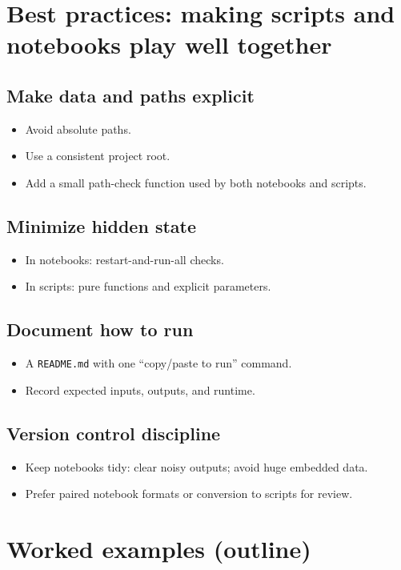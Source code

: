\section{Best practices: making scripts and notebooks play well together}
\subsection{Make data and paths explicit}
\begin{itemize}
\item Avoid absolute paths.
\item Use a consistent project root.
\item Add a small path-check function used by both notebooks and scripts.
\end{itemize}

\subsection{Minimize hidden state}
\begin{itemize}
\item In notebooks: restart-and-run-all checks.
\item In scripts: pure functions and explicit parameters.
\end{itemize}

\subsection{Document how to run}
\begin{itemize}
\item A \texttt{README.md} with one ``copy/paste to run'' command.
\item Record expected inputs, outputs, and runtime.
\end{itemize}

\subsection{Version control discipline}
\begin{itemize}
\item Keep notebooks tidy: clear noisy outputs; avoid huge embedded data.
\item Prefer paired notebook formats or conversion to scripts for review.
\end{itemize}

\section{Worked examples (outline)}
